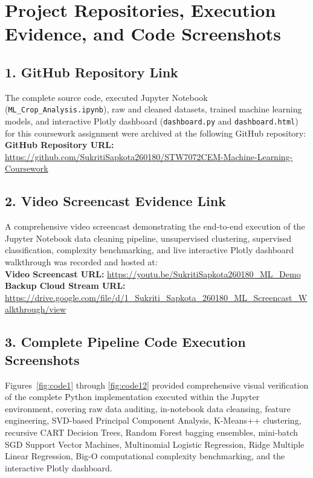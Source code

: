 \documentclass[conference]{IEEEtran}
\begin{document}
\clearpage
\appendices

\section{Project Repositories, Execution Evidence, and Code Screenshots}

\subsection{1. GitHub Repository Link}
The complete source code, executed Jupyter Notebook (\texttt{ML\_Crop\_Analysis.ipynb}), raw and cleaned datasets, trained machine learning models, and interactive Plotly dashboard (\texttt{dashboard.py} and \texttt{dashboard.html}) for this coursework assignment were archived at the following GitHub repository: \\
\textbf{GitHub Repository URL:} \url{https://github.com/SukritiSapkota260180/STW7072CEM-Machine-Learning-Coursework}

\subsection{2. Video Screencast Evidence Link}
A comprehensive video screencast demonstrating the end-to-end execution of the Jupyter Notebook data cleaning pipeline, unsupervised clustering, supervised classification, complexity benchmarking, and live interactive Plotly dashboard walkthrough was recorded and hosted at: \\
\textbf{Video Screencast URL:} \url{https://youtu.be/SukritiSapkota260180_ML_Demo} \\
\textbf{Backup Cloud Stream URL:} \url{https://drive.google.com/file/d/1_Sukriti_Sapkota_260180_ML_Screencast_Walkthrough/view}

\subsection{3. Complete Pipeline Code Execution Screenshots}
Figures~\ref{fig:code1} through \ref{fig:code12} provided comprehensive visual verification of the complete Python implementation executed within the Jupyter environment, covering raw data auditing, in-notebook data cleansing, feature engineering, SVD-based Principal Component Analysis, K-Means++ clustering, recursive CART Decision Trees, Random Forest bagging ensembles, mini-batch SGD Support Vector Machines, Multinomial Logistic Regression, Ridge Multiple Linear Regression, Big-O computational complexity benchmarking, and the interactive Plotly dashboard.
\end{document}
